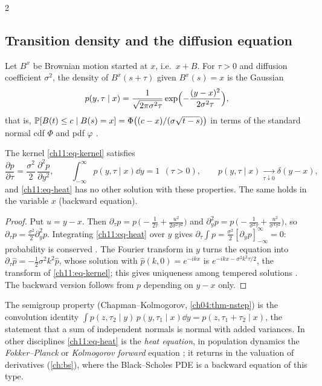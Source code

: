 \begin{paracol}{2}
\subsection{Transition density and the diffusion equation}\label{ch11:sec-diffusion}
Let $B^x$ be Brownian motion started at $x$, i.e.\ $x+B$. For $\tau>0$ and diffusion coefficient $\sigma^2$, the density of
$B^x(s+\tau)$ given $B^x(s)=x$ is the Gaussian
\begin{equation}\label{ch11:eq-kernel}
  p(y,\tau\mid x)=\frac1{\sqrt{2\pi\sigma^2\tau}}\exp\Bigl(-\frac{(y-x)^2}{2\sigma^2\tau}\Bigr),
\end{equation}
that is, $\mathbb{P}[B(t)\le c\mid B(s)=x]=\Phi\bigl((c-x)/(\sigma\sqrt{t-s})\bigr)$ in terms of the standard normal cdf $\Phi$ and pdf
$\varphi$ .

\begin{proposition}\label{ch11:prop-heat}
The kernel \eqref{ch11:eq-kernel} satisfies
\begin{equation}\label{ch11:eq-heat}
  \frac{\partial p}{\partial\tau}=\frac{\sigma^2}2\,\frac{\partial^2p}{\partial y^2},
  \qquad \int_{-\infty}^{\infty}p(y,\tau\mid x)\dd y=1\ \ (\tau>0),\qquad p(y,\tau\mid x)\xrightarrow[\tau\downarrow0]{}\delta(y-x),
\end{equation}
and \eqref{ch11:eq-heat} has no other solution with these properties. The same holds in the variable $x$ (backward equation).
\end{proposition}
\begin{proof}
Put $u=y-x$. Then $\partial_\tau p=p\,\bigl(-\tfrac1{2\tau}+\tfrac{u^2}{2\sigma^2\tau^2}\bigr)$ and
$\partial_y^2p=p\,\bigl(-\tfrac1{\sigma^2\tau}+\tfrac{u^2}{\sigma^4\tau^2}\bigr)$, so $\partial_\tau p=\tfrac{\sigma^2}2\partial_y^2p$.
Integrating \eqref{ch11:eq-heat} over $y$ gives $\partial_\tau\int p=\tfrac{\sigma^2}2[\partial_yp]_{-\infty}^{\infty}=0$: probability
is conserved . The Fourier transform in $y$ turns the equation into $\partial_\tau\hat p=-\tfrac12\sigma^2k^2\hat p$,
whose solution with $\hat p(k,0)=e^{-ikx}$ is $e^{-ikx-\sigma^2k^2\tau/2}$, the transform of \eqref{ch11:eq-kernel}; this gives uniqueness
among tempered solutions . The backward version follows from $p$ depending on $y-x$ only.
\end{proof}
The semigroup property (Chapman--Kolmogorov, \cref{ch04:thm-nstep}) is the convolution identity
$\int p(z,\tau_2\mid y)\,p(y,\tau_1\mid x)\dd y=p(z,\tau_1+\tau_2\mid x)$, the statement that a sum of independent normals is normal
with added variances. In other disciplines \eqref{ch11:eq-heat} is the \emph{heat equation}, in population dynamics the
\emph{Fokker--Planck} or \emph{Kolmogorov forward} equation ; it returns in the valuation of derivatives
(\cref{ch:bs}), where the Black--Scholes PDE is a backward equation of this type.


\end{paracol}
